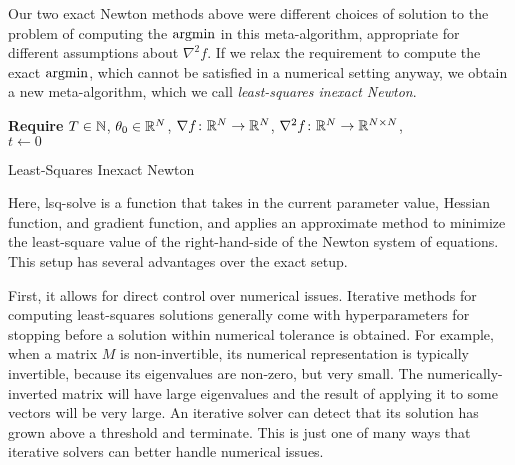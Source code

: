 \documentclass[../../thesis.tex]{subfiles}
\begin{document}
Our two exact Newton methods above
were different choices of solution to the problem
of computing the $\mathop{\mathrm{argmin}}$ in this meta-algorithm,
appropriate for different assumptions about $\nabla^2 f$.
If we relax the requirement to compute the exact $\mathop{\mathrm{argmin}}$,
which cannot be satisfied in a numerical setting anyway,
we obtain a new meta-algorithm,
which we call \emph{least-squares inexact Newton}.
\\
\begin{algorithm}[H]
    \SetAlgoLined{}
    \textbf{Require}
    $T\in \mathbb{N}$, $\theta_0 \in \mathbb{R}^N$,
    $\nabla{f}\colon\mathbb{R}^N\to\mathbb{R}^N$,
    $\nabla^2{f}\colon\mathbb{R}^N\to\mathbb{R}^{N\times N}$,
    \\
    $t \leftarrow 0$\\
    \caption{Least-Squares Inexact Newton}
\end{algorithm}

Here, lsq-solve is a function
that takes in the current parameter value,
Hessian function, and gradient function,
and applies an approximate method to minimize
the least-square value of the right-hand-side
of the Newton system of equations.
This setup has several advantages over the exact setup.

First,
it allows for direct control over numerical issues.
Iterative methods for computing least-squares solutions
generally come with hyperparameters for stopping
before a solution within numerical tolerance is obtained.
For example, when a matrix $M$ is non-invertible,
its numerical representation is typically invertible,
because its eigenvalues are non-zero, but very small.
The numerically-inverted matrix will have large eigenvalues
and the result of applying it to some vectors will be very large.
An iterative solver can detect that its solution has grown above
a threshold and terminate.
This is just one of many ways that iterative solvers
can better handle numerical issues.
\end{document}
